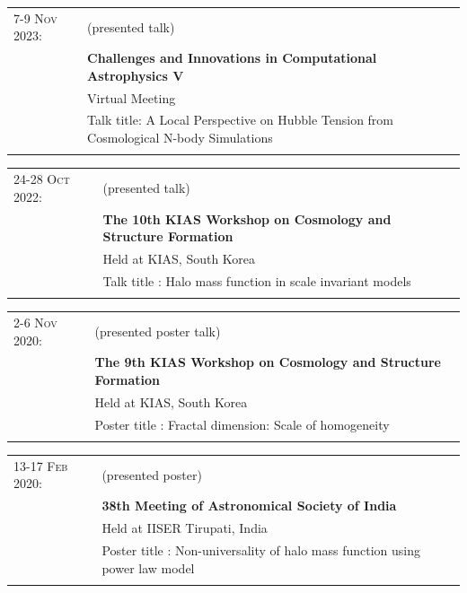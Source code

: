 \documentclass[a4paper,10pt]{article}
\begin{document}
\begin{tabular}{p{2.5cm} p{11cm}}

\textsc{7-9 Nov 2023:} & {(presented talk)}\\ 
& \textbf{{Challenges and Innovations in Computational Astrophysics V} }\\
& \footnotesize{Virtual Meeting}\\
& \footnotesize{Talk title: A Local Perspective on Hubble Tension from Cosmological N-body Simulations}\\ \\
\end{tabular}
\begin{tabular}{p{2.5cm} p{11cm}}

\textsc{24-28 Oct 2022:} & {(presented talk)}\\ 
& \textbf{{The 10th KIAS Workshop on Cosmology and Structure Formation} }\\
& \footnotesize{Held at KIAS, South Korea}\\
& \footnotesize{Talk title : Halo mass function in scale invariant models}\\ \\
\end{tabular}

\begin{tabular}{p{2.5cm} p{11cm}}
\textsc{2-6 Nov 2020:} & {(presented poster talk)}\\ 
& \textbf{{The 9th KIAS Workshop on Cosmology and Structure Formation} }\\
& \footnotesize{Held at KIAS, South Korea}\\
& \footnotesize{Poster title : Fractal dimension: Scale of homogeneity}\\ \\
\end{tabular}

\begin{tabular}{p{2.5cm} p{11cm}}
\textsc{13-17 Feb 2020:} & {(presented poster)}\\ 
& \textbf{{38th Meeting of Astronomical Society of India} }\\
& \footnotesize{Held at IISER Tirupati, India}\\
& \footnotesize{Poster title : Non-universality of halo mass function using power law model}\\ \\
\end{tabular}

\end{document}
